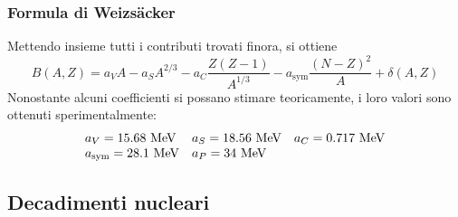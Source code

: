 \documentclass[11pt, a4paper]{scrartcl}
\theoremstyle{style}
\numberwithin{equation}{subsection}
\begin{document}
\subsubsection{Formula di Weizs\"acker}
Mettendo insieme tutti i contributi trovati finora, si ottiene 
\begin{equation}\label{semf}
	B(A,Z) = a_V A - a_S A^{2 / 3} - a_C \frac{Z(Z-1)}{A ^{1 / 3}} - a_\text{sym} \frac{(N-Z)^2}{A} + \delta(A,Z)
\end{equation}
Nonostante alcuni coefficienti si possano stimare teoricamente, i loro valori sono ottenuti sperimentalmente:
\begin{equation}
	\begin{array}
		{l l l}
		a_V = 15.68 \text{ MeV} & a_S = 18.56 \text{ MeV} & a_C = 0.717 \text{ MeV} \\
		a_\text{sym} = 28.1 \text{ MeV} & a_P = 34 \text{ MeV} &
	\end{array}
\end{equation}

\subsection{Decadimenti nucleari}
\end{document}
